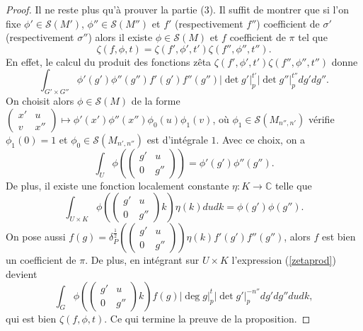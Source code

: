 \begin{proof}
Il ne reste plus qu'à prouver la partie (3). Il suffit de montrer que si l'on fixe $\phi' \in \mathcal{S}(M')$, $\phi'' \in \mathcal{S}(M'')$ et $f'$ (respectivement $f''$) coefficient de $\sigma'$ (respectivement $\sigma''$) alors il existe $\phi \in \mathcal{S}(M)$ et $f$ coefficient de $\pi$ tel que
\begin{equation}
\zeta(f,\phi,t)=\zeta(f',\phi',t')\zeta(f'',\phi'',t'').
\end{equation}
En effet, le calcul du produit des fonctions zêta $\zeta(f',\phi',t')\zeta(f'',\phi'',t'')$ donne
\begin{equation}
\label{zetaprod}
\int_{G' \times G''} \phi'(g')\phi''(g'')f'(g')f''(g'')|\det g'|_p^{t'}|\det g''|_p^{t''}dg'dg''.
\end{equation}
On choisit alors $\phi \in \mathcal{S}(M)$ de la forme $\begin{pmatrix} 
x' & u \\
v & x'' 
\end{pmatrix} \mapsto \phi'(x')\phi''(x'')\phi_0(u)\phi_1(v)$, où $\phi_1 \in \mathcal{S}(M_{n'',n'})$ vérifie $\phi_1(0)=1$ et $\phi_0 \in \mathcal{S}(M_{n',n''})$ est d'intégrale $1$. Avec ce choix, on a
\begin{equation}
\int_U \phi(\begin{pmatrix} 
g' & u \\
0 & g'' 
\end{pmatrix})=\phi'(g')\phi''(g'').
\end{equation}
De plus, il existe une fonction localement constante $\eta : K \rightarrow \mathbb{C}$ telle que
\begin{equation}
\int_{U \times K} \phi(\begin{pmatrix} 
g' & u \\
0 & g'' 
\end{pmatrix}k)\eta(k)dudk = \phi(g')\phi(g'').
\end{equation}
On pose aussi $f(g)=\delta_P^{\frac{1}{2}}(\begin{pmatrix} 
g' & u \\
0 & g'' 
\end{pmatrix})\eta(k)f'(g')f''(g'')$, alors $f$ est bien un coefficient de $\pi$. De plus, en intégrant sur $U \times K$ l'expression (\ref{zetaprod}) devient
\begin{equation}
\int_G \phi(\begin{pmatrix} 
g' & u \\
0 & g'' 
\end{pmatrix}k)f(g)|\deg g|_p^t|\det g'|_p^{-n''}dg'dg''dudk,
\end{equation}
qui est bien $\zeta(f,\phi,t)$. Ce qui termine la preuve de la proposition.
\end{proof}